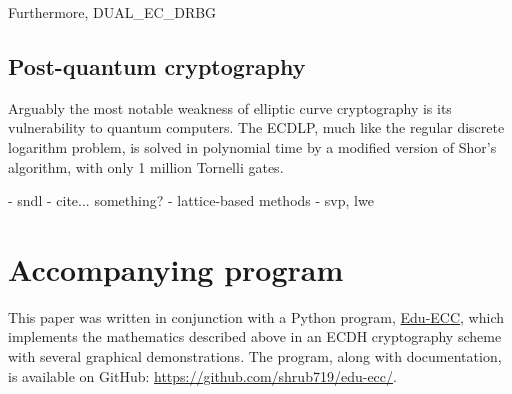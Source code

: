 \documentclass[a4paper]{article}
\begin{document}
Furthermore, DUAL\_EC\_DRBG\cite{blog}

\subsection{Post-quantum cryptography}

Arguably the most notable weakness of elliptic curve cryptography is its vulnerability to quantum computers.\cite{that one really short paper} The ECDLP, much like the regular discrete logarithm problem, is solved in polynomial time by a modified version of Shor's algorithm, with only 1 million Tornelli gates.\cite{that one with gates. also correct this}

- sndl - cite... something?
- lattice-based methods
    - svp, lwe


\section{Accompanying program}

This paper was written in conjunction with a Python program, \href{https://github.com/shrub719/edu-ecc/}{Edu-ECC}, which implements the mathematics described above in an ECDH cryptography scheme with several graphical demonstrations. The program, along with documentation, is available on GitHub: \url{https://github.com/shrub719/edu-ecc/}.


\newpage


\end{document}

